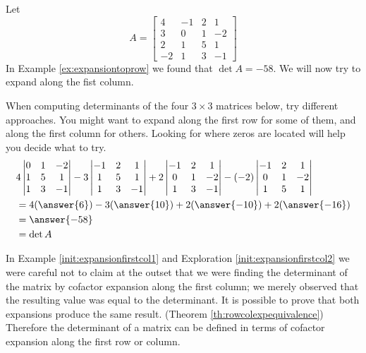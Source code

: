 \documentclass{ximera}
\begin{document}
\begin{exploration}\label{init:expansionfirstcol2}
Let
$$A=\begin{bmatrix}4&-1&2&1\\3&0&1&-2\\
2&1&5&1\\-2&1&3&-1\end{bmatrix}$$
In Example \ref{ex:expansiontoprow} we found that $\det{A}=-58$.  We will now try to expand along the fist column.  

When computing determinants of the four $3\times 3$ matrices below, try different approaches.  You might want to expand along the first row for some of them, and along the first column for others.  Looking for where zeros are located will help you decide what to try.
\begin{align*}
&4\begin{vmatrix}0&1&-2\\1&5&1\\1&3&-1\end{vmatrix}-3\begin{vmatrix}-1&2&1\\1&5&1\\1&3&-1\end{vmatrix}+2\begin{vmatrix}-1&2&1\\0&1&-2\\1&3&-1\end{vmatrix}-(-2)\begin{vmatrix}-1&2&1\\0&1&-2\\1&5&1\end{vmatrix}\\
&=4(\answer{6})-3(\answer{10})+2(\answer{-10})+2(\answer{-16})\\
&=\answer{-58}\\
&=\det{A}
\end{align*}
\end{exploration}

In Example \ref{init:expansionfirstcol1} and Exploration \ref{init:expansionfirstcol2} we were careful not to claim at the outset that we were finding the determinant of the matrix by cofactor expansion along the first column; we merely observed that the resulting value was equal to the determinant.  It is possible to prove that both expansions produce the same result. (Theorem \ref{th:rowcolexpequivalence})  Therefore the determinant of a matrix can be defined in terms of cofactor expansion along the first row or column.  
\end{document}

